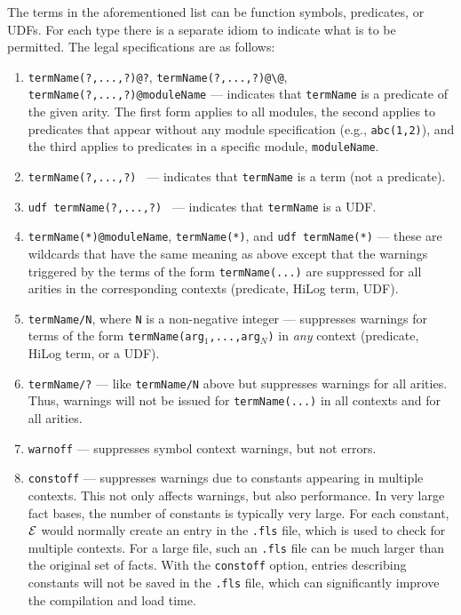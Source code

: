 \documentclass[11pt]{article}
\newcommand{\ERGO}{\mbox{\ensuremath{\cal{E}}\smaller{{\sc{RGO}}}}\xspace}
\newcommand{\FLSYSTEM}{\ERGO}
\newcommand{\bs}{\textbackslash}
\begin{document}
The terms in the aforementioned list can be function symbols, predicates,
or UDFs. For each type there is a separate idiom to indicate what is to be
permitted.
The legal specifications are as follows:
\begin{enumerate}
\item \texttt{termName(?,...,?)@?}, \texttt{termName(?,...,?)@\bs{}@},
  \texttt{termName(?,...,?)@moduleName} --- indicates that
  \texttt{termName} is a predicate of the given arity. The first form
  applies to all modules,
  the second applies to predicates that appear without any module specification
  (e.g., \texttt{abc(1,2)}), and the third applies to predicates in a
  specific module, \texttt{moduleName}.  
\item {\tt termName(?,...,?) } --- indicates that \texttt{termName} is a
  term (not a predicate).
\item {\tt udf termName(?,...,?) } --- indicates that \texttt{termName}
  is a UDF.
\item \texttt{termName(*)@moduleName}, \texttt{termName(*)}, and \texttt{udf
    termName(*)} --- these are wildcards that have the same meaning as
  above except that the warnings triggered by the terms of the form
  \texttt{termName(...)}  are suppressed for all arities in the
  corresponding contexts (predicate, HiLog term, UDF).
\item \texttt{termName/N}, where \texttt{N} is a non-negative integer ---
  suppresses warnings for terms of the form
  \texttt{termName(arg$_1$,...,arg$_N$)} in \emph{any} context (predicate,
  HiLog term, or a UDF).
\item \texttt{termName/?} --- like \texttt{termName/N} above but suppresses
  warnings for all arities. Thus, warnings will not be issued for
  \texttt{termName(...)} in all contexts and for all arities.
\item \texttt{warnoff} --- suppresses symbol context warnings, but not errors.
\item \texttt{constoff} --- suppresses warnings due to constants appearing
  in multiple contexts. This not only affects warnings, but also performance.
  In very large fact bases, the number of constants is typically very large.
  For each constant, \FLSYSTEM would normally create an entry in the
  \texttt{.fls} file, which is used to check for multiple contexts.
  For a large file, such an \texttt{.fls} file can be much larger than the
  original set of facts. 
  With the \texttt{constoff} option, entries describing constants  will not be
  saved in the \texttt{.fls} file, which can significantly improve the
  compilation and load time. 
\end{enumerate}
\end{document}
